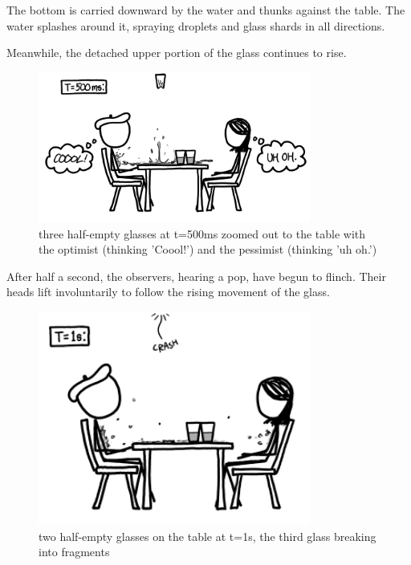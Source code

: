 {The bottom is carried downward by the water and thunks against the table. The water splashes around it, spraying droplets and glass shards in all directions.}

{Meanwhile, the detached upper portion of the glass continues to rise.}

\begin{figure}[!htbp]
\centering
\includegraphics[scale=0.5, max width=0.8\textwidth]{imgs/a/6/glass_500ms.png}
\caption{three half-empty glasses at t=500ms zoomed out to the table with the optimist (thinking 'Coool!') and the pessimist (thinking 'uh oh.')}
\end{figure}

{After half a second, the observers, hearing a pop, have begun to flinch. Their heads lift involuntarily to follow the rising movement of the glass.}

\begin{figure}[!htbp]
\centering
\includegraphics[scale=0.5, max width=0.8\textwidth]{imgs/a/6/glass_1s.png}
\caption{two half-empty glasses on the table at t=1s, the third glass breaking into fragments }
\end{figure}

